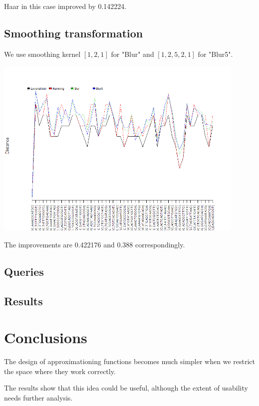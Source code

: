 \documentclass [12pt, a4]{article} %
\begin{document}
Haar in this case improved by 0.142224.

\subsection{Smoothing transformation}

We use smoothing kernel $[1,2,1]$ for "Blur" and $[1,2,5,2,1]$ for "Blur5".

\includegraphics[width=0.9\textwidth]{img/blur.png}

The improvements are 0.422176 and 0.388 correspondingly.

\subsection{Queries}

\subsection{Results}

\section{Conclusions}

The design of approximationing functions becomes much simpler when we restrict the
space where they work correctly.

The results show that this idea could be useful, although the extent of usability
needs further analysis.

\nocite{*}


\end{document}
